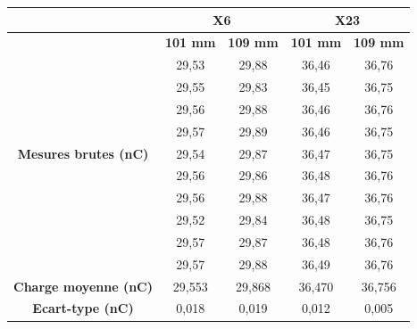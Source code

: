 \documentclass{article}
\begin{document}
\begin{table}[h]
  \centering
  \begin{tabular}{c|cc|cc|}
  \cline{2-5}
                                                           & \multicolumn{2}{c|}{\textbf{X6}} & \multicolumn{2}{c|}{\textbf{X23}} \\ \hline
  \multicolumn{1}{|c|}{\multirow{11}{*}{\textbf{Mesures brutes (nC)}}} & \textbf{101 mm} & \textbf{109 mm} & \textbf{101 mm} & \textbf{109 mm} \\ \cline{2-5} 
  \multicolumn{1}{|c|}{}                                   & 29,53           & 29,88          & 36,46           & 36,76           \\
  \multicolumn{1}{|c|}{}                                   & 29,55           & 29,83          & 36,45           & 36,75           \\
  \multicolumn{1}{|c|}{}                                   & 29,56           & 29,88          & 36,46           & 36,76           \\
  \multicolumn{1}{|c|}{}                                   & 29,57           & 29,89          & 36,46           & 36,75           \\
  \multicolumn{1}{|c|}{}                                   & 29,54           & 29,87          & 36,47           & 36,75           \\
  \multicolumn{1}{|c|}{}                                   & 29,56           & 29,86          & 36,48           & 36,76           \\
  \multicolumn{1}{|c|}{}                                   & 29,56           & 29,88          & 36,47           & 36,76           \\
  \multicolumn{1}{|c|}{}                                   & 29,52           & 29,84          & 36,48           & 36,75           \\
  \multicolumn{1}{|c|}{}                                   & 29,57           & 29,87          & 36,48           & 36,76           \\
  \multicolumn{1}{|c|}{}                                   & 29,57           & 29,88          & 36,49           & 36,76           \\ \hline
  \multicolumn{1}{|c|}{\textbf{Charge moyenne   (nC)}}     & 29,553          & 29,868         & 36,470          & 36,756          \\
  \multicolumn{1}{|c|}{\textbf{Ecart-type (nC)}}           & 0,018           & 0,019          & 0,012           & 0,005           \\ \hline

\end{tabular}
\end{table}
\end{document}
